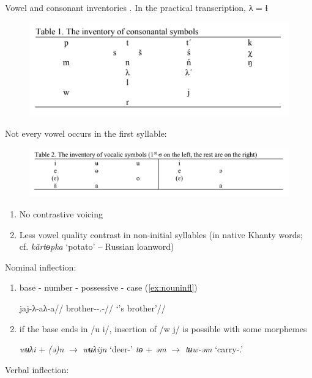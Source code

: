 \documentclass[a4paper, 12pt]{article}
\begin{document}
	\noindent Vowel and consonant inventories \parencite{lketal2018}. In the practical transcription, λ = ɬ
	
	\begin{figure}[H]
		\includegraphics[scale=.66]{consonants}
	\end{figure}
	
	\newpage
	\noindent Not every vowel occurs in the first syllable:
	
	\begin{figure}[H]
		\includegraphics[scale=.66]{vowels}
	\end{figure}
	
\begin{enumerate}[$\gg$]
	\item No contrastive voicing
	\item Less vowel quality contrast in non-initial syllables (in native Khanty words; cf. \emph{kǎrtɵpka} `potato' -- Russian loanword)
\end{enumerate}
	Nominal inflection:

\begin{enumerate}[$\gg$]
	\item base - number - possessive - case (\ref{ex:nouninfl})
	
\ex
\begingl\label{ex:nouninfl}
	\gla jaj-λ-aλ-a//
	\glb brother-{\Pl}-{\Poss}.{\Tsg}-{\Dat}//
	\glft `{\Tsg}'s brother'//
\endgl
\xe
	
	\item if the base ends in /u i/, insertion of /w j/ is possible with some morphemes
	
	\pex 
		\a \emph{wʉλi} + \emph{(ə)n} $\rightarrow$ \emph{wʉλijn} `deer-{\Loc}'
		\a \emph{tɵ} + \emph{əm} $\rightarrow$ \emph{tʉw-əm} `carry-{\Nfin}.{\Pst}'
	\xe
	
\end{enumerate}
	Verbal inflection:
\end{document}
